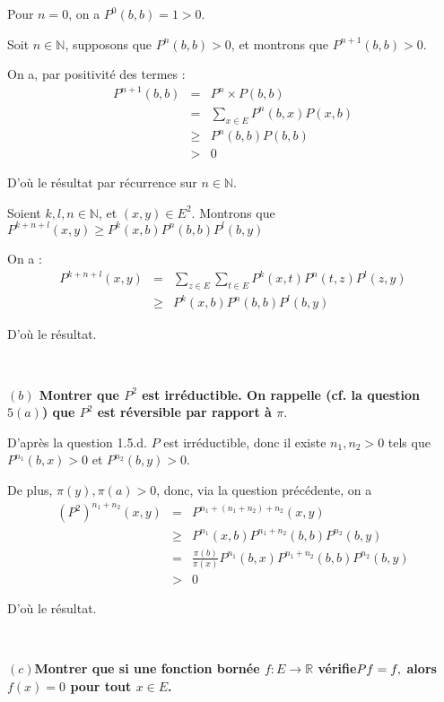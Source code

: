 Pour $n = 0$, on a $P^0 (b, b) = 1 > 0$.

Soit $n \in \mathbb{N}$, supposons que $P^n (b, b) > 0$, et montrons que
$P^{n + 1} (b, b) > 0$.

On a, par positivit{\'e} des termes :
\begin{eqnarray*}
  P^{n + 1} (b, b) & = & P^n \times P (b, b)\\
  & = & \underset{x \in E}{\sum} P^n (b, x) P (x, b)\\
  & \geqslant & P^n (b, b) P (b, b)\\
  & > & 0
\end{eqnarray*}


D'o{\`u} le r{\'e}sultat par r{\'e}currence sur $n \in \mathbb{N}$.

Soient $k, l, n \in \mathbb{N}$, et $(x, y) \in E^2$. Montrons que $P^{k + n +
l} (x, y) \geq P^k (x, b) P^n (b, b) P^l (b, y)$

On a :
\begin{eqnarray*}
  P^{k + n + l} (x, y) & = & \underset{z \in E}{\sum} \underset{t \in E}{\sum}
  P^k (x, t) P^n (t, z) P^l (z, y)\\
  & \geqslant & P^k (x, b) P^n (b, b) P^l (b, y)
\end{eqnarray*}


D'o{\`u} le r{\'e}sultat.

\

\textbf{$(b)$ Montrer que $P^2$ est irr{\'e}ductible. On rappelle
(cf. la question $5 (a)$) que $P^2$ est r{\'e}versible par rapport {\`a} $\pi
.$}

D'apr{\`e}s la question 1.5.d. $P$ est irr{\'e}ductible, donc il existe $n_1,
n_2 > 0$ tels que $P^{n_1} (b, x) > 0$ et $P^{n_2} (b, y) > 0$.

De plus, $\pi (y), \pi (a) > 0$, donc, via la question pr{\'e}c{\'e}dente, on
a
\begin{eqnarray*}
  (P^2)^{n_1 + n_2} (x, y) & = & P^{n_1 + (n_1 + n_2) + n_2} (x, y)\\
  & \geqslant & P^{n_1} (x, b) P^{n_1 + n_2} (b, b) P^{n_2} (b, y)\\
  & = & \frac{\pi (b)}{\pi (x)} P^{n_1} (b, x) P^{n_1 + n_2} (b, b) P^{n_2}
  (b, y)\\
  & > & 0
\end{eqnarray*}


D'o{\`u} le r{\'e}sultat.

\

\textbf{$(c)$Montrer que si une fonction born{\'e}e $f : E
\rightarrow \mathbb{R}$ v{\'e}rifie$P f = \nonconverted{minus} f,$ alors $f
(x) = 0$ pour tout $x \in E$.}

